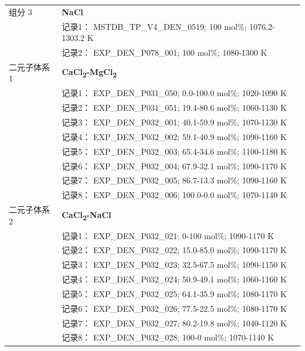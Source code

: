 \documentclass[12pt]{article}
\begin{document}
{\begin{longtable}[]{@{}
  >{\raggedright\arraybackslash}p{}
  >{\raggedright\arraybackslash}p{}@{}}
组分 3  & \textbf{NaCl} \\
 & 记录1： MSTDB\_TP\_V4\_DEN\_0519; 100 mol\%; 1076.2-1303.2 K \\
 & 记录2： EXP\_DEN\_P078\_001; 100 mol\%; 1080-1300 K  \\

二元子体系 1  & \textbf{CaCl\textsubscript{2}-MgCl\textsubscript{2}} \\
 & 记录1： EXP\_DEN\_P031\_050; 0.0-100.0 mol\%; 1020-1090 K \\
 & 记录2： EXP\_DEN\_P031\_051; 19.4-80.6 mol\%; 1060-1130 K \\
 & 记录3： EXP\_DEN\_P032\_001; 40.1-59.9 mol\%; 1070-1130 K \\
 & 记录4： EXP\_DEN\_P032\_002; 59.1-40.9 mol\%; 1090-1160 K \\
 & 记录5： EXP\_DEN\_P032\_003; 65.4-34.6 mol\%; 1100-1180 K \\
 & 记录6： EXP\_DEN\_P032\_004; 67.9-32.1 mol\%; 1090-1170 K \\
 & 记录7： EXP\_DEN\_P032\_005; 86.7-13.3 mol\%; 1090-1160 K \\
 & 记录8： EXP\_DEN\_P032\_006; 100.0-0.0 mol\%; 1070-1140 K  \\

二元子体系 2  & \textbf{CaCl\textsubscript{2}-NaCl} \\
 & 记录1： EXP\_DEN\_P032\_021; 0-100 mol\%; 1090-1170 K \\
 & 记录2： EXP\_DEN\_P032\_022; 15.0-85.0 mol\%; 1090-1170 K \\
 & 记录3： EXP\_DEN\_P032\_023; 32.5-67.5 mol\%; 1090-1150 K \\
 & 记录4： EXP\_DEN\_P032\_024; 50.9-49.1 mol\%; 1060-1160 K \\
 & 记录5： EXP\_DEN\_P032\_025; 64.1-35.9 mol\%; 1080-1170 K \\
 & 记录6： EXP\_DEN\_P032\_026; 77.5-22.5 mol\%; 1080-1170 K \\
 & 记录7： EXP\_DEN\_P032\_027; 80.2-19.8 mol\%; 1040-1120 K \\
 & 记录8： EXP\_DEN\_P032\_028; 100-0 mol\%; 1070-1140 K  \\


\end{longtable}}
\end{document}
